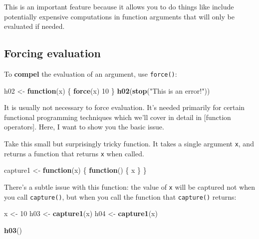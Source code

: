 \documentclass[]{book}
\newenvironment{Shaded}{\begin{snugshade}}{\end{snugshade}}
\newcommand{\ControlFlowTok}[1]{\textcolor[rgb]{0.13,0.29,0.53}{\textbf{#1}}}
\newcommand{\DecValTok}[1]{\textcolor[rgb]{0.00,0.00,0.81}{#1}}
\newcommand{\KeywordTok}[1]{\textcolor[rgb]{0.13,0.29,0.53}{\textbf{#1}}}
\newcommand{\NormalTok}[1]{#1}
\newcommand{\StringTok}[1]{\textcolor[rgb]{0.31,0.60,0.02}{#1}}
\theoremstyle{definition}
\theoremstyle{definition}
\theoremstyle{definition}
\theoremstyle{remark}
\begin{document}
This is an important feature because it allows you to do things like
include potentially expensive computations in function arguments that
will only be evaluated if needed.

\hypertarget{forcing-evaluation}{%
\subsection{Forcing evaluation}\label{forcing-evaluation}}

To \textbf{compel} the evaluation of an argument, use \texttt{force()}:

\begin{Shaded}
\begin{Highlighting}[]
\NormalTok{h02 <-}\StringTok{ }\ControlFlowTok{function}\NormalTok{(x) \{}
  \KeywordTok{force}\NormalTok{(x)}
  \DecValTok{10}
\NormalTok{\}}
\KeywordTok{h02}\NormalTok{(}\KeywordTok{stop}\NormalTok{(}\StringTok{"This is an error!"}\NormalTok{))}
\end{Highlighting}
\end{Shaded}

It is usually not necessary to force evaluation. It's needed primarily
for certain functional programming techniques which we'll cover in
detail in {[}function operators{]}. Here, I want to show you the basic
issue.

Take this small but surprisingly tricky function. It takes a single
argument \texttt{x}, and returns a function that returns \texttt{x} when
called.

\begin{Shaded}
\begin{Highlighting}[]
\NormalTok{capture1 <-}\StringTok{ }\ControlFlowTok{function}\NormalTok{(x) \{}
  \ControlFlowTok{function}\NormalTok{() \{}
\NormalTok{    x}
\NormalTok{  \}}
\NormalTok{\}}
\end{Highlighting}
\end{Shaded}

There's a subtle issue with this function: the value of \texttt{x} will
be captured not when you call \texttt{capture()}, but when you call the
function that \texttt{capture()} returns:

\begin{Shaded}
\begin{Highlighting}[]
\NormalTok{x <-}\StringTok{ }\DecValTok{10}
\NormalTok{h03 <-}\StringTok{ }\KeywordTok{capture1}\NormalTok{(x)}
\NormalTok{h04 <-}\StringTok{ }\KeywordTok{capture1}\NormalTok{(x)}

\KeywordTok{h03}\NormalTok{()}
\end{Highlighting}
\end{Shaded}
\end{document}
